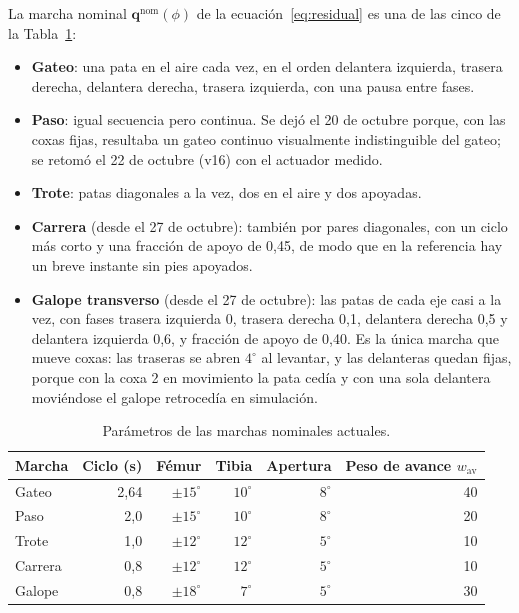 La marcha nominal $\mathbf{q}^{\text{nom}}(\phi)$ de la ecuación~\eqref{eq:residual}
es una de las cinco de la Tabla~\ref{tab:marchas-nominales}:
\begin{itemize}
    \item \textbf{Gateo}: una pata en el aire cada vez, en el orden delantera
    izquierda, trasera derecha, delantera derecha, trasera izquierda, con una
    pausa entre fases.
    \item \textbf{Paso}: igual secuencia pero continua. Se dejó el 20 de octubre
    porque, con las coxas fijas, resultaba un gateo continuo visualmente
    indistinguible del gateo; se retomó el 22 de octubre (v16) con el actuador
    medido.
    \item \textbf{Trote}: patas diagonales a la vez, dos en el aire y dos apoyadas.
    \item \textbf{Carrera} (desde el 27 de octubre): también por pares diagonales,
    con un ciclo más corto y una fracción de apoyo de 0,45, de modo que en la
    referencia hay un breve instante sin pies apoyados.
    \item \textbf{Galope transverso} (desde el 27 de octubre): las patas de cada eje
    casi a la vez, con fases trasera izquierda 0, trasera derecha 0,1, delantera
    derecha 0,5 y delantera izquierda 0,6, y fracción de apoyo de 0,40. Es la única
    marcha que mueve coxas: las traseras se abren $4^\circ$ al levantar, y las
    delanteras quedan fijas, porque con la coxa 2 en movimiento la pata cedía y
    con una sola delantera moviéndose el galope retrocedía en simulación.
\end{itemize}

\begin{table}[H]
\centering
\caption{Parámetros de las marchas nominales actuales.}
\label{tab:marchas-nominales}
\small
\begin{tabular}{lrrrrr}
\toprule
Marcha & Ciclo (s) & Fémur & Tibia & Apertura & Peso de avance $w_{\text{av}}$ \\
\midrule
Gateo & 2,64 & $\pm15^\circ$ & $10^\circ$ & $8^\circ$ & 40 \\
Paso & 2,0 & $\pm15^\circ$ & $10^\circ$ & $8^\circ$ & 20 \\
Trote & 1,0 & $\pm12^\circ$ & $12^\circ$ & $5^\circ$ & 10 \\
Carrera & 0,8 & $\pm12^\circ$ & $12^\circ$ & $5^\circ$ & 10 \\
Galope & 0,8 & $\pm18^\circ$ & $7^\circ$ & $5^\circ$ & 30 \\
\bottomrule
\end{tabular}
\end{table}

